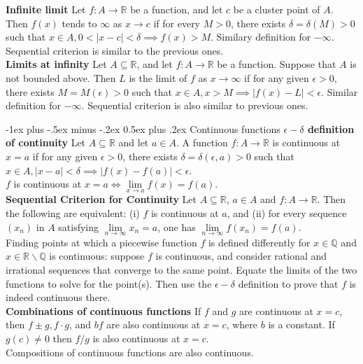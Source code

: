 \documentclass[10pt,landscape]{article}
\makeatletter
\renewcommand{\section}{\@startsection{section}{1}{0mm}%
                                {-1ex plus -.5ex minus -.2ex}%
                                {0.5ex plus .2ex}%
                                {\normalfont\large\bfseries}}
\makeatother
\begin{document}
\begin{multicols}{3}
\textbf{Infinite limit} Let  $f:A\to\mathbb{R}$ be a function, and let  $c$ be a cluster point of  $A$. Then  $f(x)$ tends to  $\infty$ as  $x\to c$ if for every  $M>0$, there exists  $\delta=\delta(M)>0$ such that  $x\in A,0<|x-c|<\delta\implies f(x)>M$. Similary definition for  $-\infty$. Sequential criterion is similar to the previous ones.\\
\textbf{Limits at infinity} Let $A\subseteq\mathbb{R}$, and let  $f:A\to\mathbb{R}$ be a function. Suppose that  $A$ is not bounded above. Then  $L$ is the limit of  $f$ as  $x\to\infty$ if for any given  $\epsilon>0$, there exists  $M=M(\epsilon)>0$ such that  $x\in A,x>M\implies|f(x)-L|<\epsilon$. Similar definition for  $-\infty$. Sequential criterion is also similar to previous ones.

\section{Continuous functions}
\textbf{$\epsilon-\delta$ definition of continuity} Let $A\subseteq\mathbb{R}$ and let  $a\in A$. A function  $f:A\to\mathbb{R}$ is continuous at  $x=a$ if for any given  $\epsilon>0$, there exists  $\delta=\delta(\epsilon,a)>0$ such that  $x\in A,|x-a|<\delta\implies|f(x)-f(a)|<\epsilon$.\\
$f$ is continuous at  $x=a\iff\lim\limits_{x\to a}f(x)=f(a)$.\\
\textbf{Sequential Criterion for Continuity} Let $A\subseteq\mathbb{R}$,  $a\in A$ and  $f:A\to\mathbb{R}$. Then the following are equivalent: (i)  $f$ is continuous at  $a$, and (ii) for every sequence  $(x_n)$ in  $A$ satisfying  $\lim\limits_{n\to\infty}x_n=a$, one has  $\lim\limits_{n\to\infty}f(x_n)=f(a)$.\\
Finding points at which a piecewise function $f$ is defined differently for $x\in\mathbb{Q}$ and  $x\in\mathbb{R}\backslash\mathbb{Q}$ is continuous: suppose $f$ is continuous, and consider rational and irrational sequences that converge to the same point. Equate the limits of the two functions to solve for the point(s). Then use the $\epsilon-\delta$ definition to prove that  $f$ is indeed continuous there.\\
\textbf{Combinations of continuous functions} If $f$ and  $g$ are continuous at  $x=c$, then  $f\pm g, f\cdot g$, and $bf$ are also continuous at  $x=c$, where  $b$ is a constant. If  $g(c)\neq 0$ then $f/g$ is also continuous  at $x=c$.\\
Compositions of continuous functions are also continuous.\\

\end{multicols}
\end{document}
